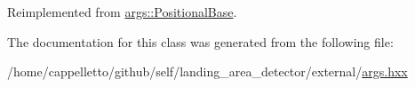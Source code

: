 Reimplemented from \hyperlink{classargs_1_1_positional_base_a14edfb214858983cf5116c8d0fec72ea}{args\+::\+Positional\+Base}.



The documentation for this class was generated from the following file\+:\begin{DoxyCompactItemize}
\item 
/home/cappelletto/github/self/landing\+\_\+area\+\_\+detector/external/\hyperlink{args_8hxx}{args.\+hxx}\end{DoxyCompactItemize}
